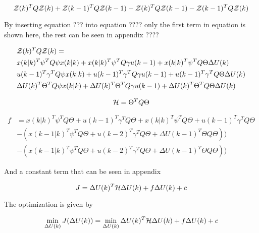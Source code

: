 \begin{equation}
	\CMcal{Z}(k)^TQ\CMcal{Z}(k)+ \CMcal{Z}(k-1)^TQ\CMcal{Z}(k-1)-\CMcal{Z}(k)^TQ\CMcal{Z}(k-1)-\CMcal{Z}(k-1)^TQ\CMcal{Z}(k)
\end{equation}


By inserting equation ??? into equation ???? only the first term in equation is shown here, the rest can be seen in appendix ????

\begin{equation}
	\begin{aligned}
	&\CMcal{Z}(k)^TQ\CMcal{Z}(k) = \\
	& x(k|k)^T\psi ^T Q \psi x(k|k) + x(k|k)^T \psi ^T Q \gamma u(k-1) + x(k|k)^T \psi ^T Q \Theta \Delta U(k) \\
	& u(k-1)^T \gamma ^T Q \psi x(k|k) +  u(k-1)^T \gamma ^T Q \gamma u(k-1) + u(k-1)^T \gamma ^T Q\Theta \Delta U(k)\\ 
	& \Delta U(k)^T \Theta ^T Q  \psi x(k|k)+\Delta U(k)^T \Theta ^T Q \gamma u(k-1) +\Delta U(k)^T \Theta ^T Q \Theta \Delta U(k)
	\end{aligned}
\end{equation}



\begin{equation}
	\CMcal{H} = \Theta^T Q\Theta 
\end{equation}

\begin{equation}
	\begin{aligned}
	f &= x(k|k)^T\psi ^T Q\Theta+u(k-1)^T\gamma ^T Q \Theta +x(k|k)^T\psi^T Q \Theta+u(k-1)^T \gamma ^T Q \Theta \\
	& -(x(k-1|k)^T \psi^T Q \Theta+u(k-2)^T \gamma^T Q \Theta +\Delta U(k-1)^T\Theta Q \Theta)) \\
	& -(x(k-1|k)^T \psi^T Q \Theta + u(k-2)^T \gamma^T Q \Theta +\Delta U(k-1)^T\Theta Q \Theta))
	\end{aligned}
\end{equation}

And a constant term that can be seen in appendix

\begin{equation}
	J = \Delta U(k)^T\CMcal{H}\Delta U(k)+ f\Delta U(k)+ c
\end{equation}

The optimization is given by

\begin{equation}
	\min_{\Delta U(k)} J(\Delta U(k)) =\min_{\Delta U(k)} \Delta U(k)^T\CMcal{H}\Delta U(k)+f\Delta U(k)+c
\end{equation}